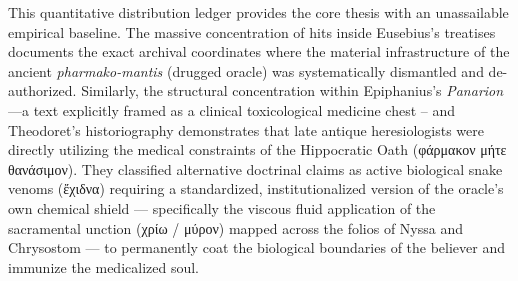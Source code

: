\documentclass[11pt,twoside,a4paper]{article}
\begin{document}
This quantitative distribution ledger provides the core thesis with an unassailable empirical baseline. The massive concentration of hits inside Eusebius's treatises documents the exact archival coordinates where the material infrastructure of the ancient \textit{pharmako-mantis} (drugged oracle) was systematically dismantled and de-authorized. Similarly, the structural concentration within Epiphanius's \textit{Panarion}---a text explicitly framed as a clinical toxicological medicine chest -- and Theodoret's historiography demonstrates that late antique heresiologists were directly utilizing the medical constraints of the Hippocratic Oath (\textgreek{φάρμακον μήτε θανάσιμον}). They classified alternative doctrinal claims as active biological snake venoms (\textgreek{ἔχιδνα}) requiring a standardized, institutionalized version of the oracle's own chemical shield — specifically the viscous fluid application of the sacramental unction (\textgreek{χρίω / μύρον}) mapped across the folios of Nyssa and Chrysostom — to permanently coat the biological boundaries of the believer and immunize the medicalized soul.
\end{document}
